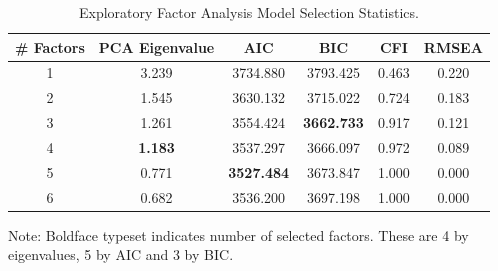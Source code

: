 
\begin{table}[htbp]
    \centering
    \caption{Exploratory Factor Analysis Model Selection Statistics.}
    \label{tab:EFA-10}
    \begin{threeparttable}
        \begin{tabular}{cccccc
        }
            \toprule
            {# Factors} & {PCA Eigenvalue} & {AIC} & {BIC} & {CFI} & {RMSEA}\\
            \midrule
            1 & 3.239 & 3734.880 & 3793.425 & 0.463 & 0.220\\
            2 & 1.545 & 3630.132 & 3715.022 & 0.724 & 0.183\\
            3 & 1.261 & 3554.424 & {\textbf{3662.733}} & 0.917 & 0.121\\
            4 & \textbf{1.183} & 3537.297 & 3666.097 & 0.972 & 0.089\\
            5 & 0.771 & {\textbf{3527.484}} & 3673.847 & 1.000 & 0.000\\
            6 & 0.682 & 3536.200 & 3697.198 & 1.000 & 0.000\\
            \bottomrule
        \end{tabular}
        \vspace{5pt}
        \begin{tablenotes}
            \small
            \item Note: Boldface typeset indicates number of selected factors.  These are 4 by eigenvalues, 5 by AIC and 3 by BIC.
        \end{tablenotes}
    \end{threeparttable}
\end{table}



